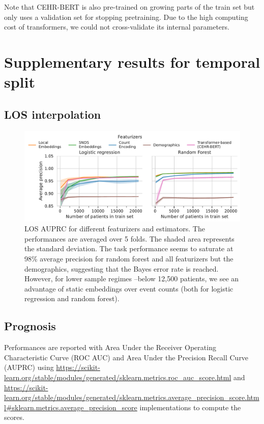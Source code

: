\documentclass[french,12pt,twoside,a4paper]{book}
\begin{document}
\begin{appendices}
  Note that CEHR-BERT is also pre-trained on growing parts of the train
  set but only uses a validation set for stopping pretraining. Due to the high
  computing cost of transformers, we could not cross-validate its internal
  parameters.


  \section{Supplementary results for temporal split}\label{apd:temporal_split}

  \subsection{LOS interpolation}\label{apd:temporal_split:los}

  \begin{figure}[!h]
    \centering
    \includegraphics[width=\linewidth]{img/chapter_3/los/average_precision_score_performances.pdf}
    \caption{LOS AUPRC for different featurizers and estimators.
      The performances are averaged over 5 folds. The shaded area represents the
      standard deviation. The task performance seems to saturate at 98\% average
      precision for random forest and all featurizers but the demographics,
      suggesting that the Bayes error rate is reached. However, for lower sample
      regimes --below 12,500 patients, we see an advantage of static embeddings
      over event counts (both for logistic regression and random forest).}%
    \label{fig:los_auprc}
  \end{figure}



  \subsection{Prognosis}\label{apd:temporal_split:prognosis}

  Performances are reported with Area Under the Receiver Operating
  Characteristic Curve (ROC AUC) and Area Under the Precision Recall Curve
  (AUPRC) using
  \url{https://scikit-learn.org/stable/modules/generated/sklearn.metrics.roc_auc_score.html}
  and
  \url{https://scikit-learn.org/stable/modules/generated/sklearn.metrics.average_precision_score.html#sklearn.metrics.average_precision_score}
  implementations to compute the scores.


\end{appendices}
\end{document}

